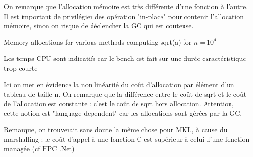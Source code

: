 On remarque que l'allocation mémoire est très différente d'une fonction à l'autre. Il est important de privilégier des opération "in-place" pour contenir l'allocation mémoire, sinon on risque de déclencher la GC qui est couteuse.

\begin{table}[]
\centering
{}
\caption{Memory allocations for various methods computing sqrt(a) for $n = 10^4$}
\end{table}


\newpage


Les temps CPU sont indicatifs car le bench est fait sur une durée caractéristique trop courte


Ici on met en évidence la non linéarité du coût d'allocation par élément d'un tableau de taille n.
On remarque que la différence entre le coût de sqrt et le coût de l'allocation est constante : c'est le coût de sqrt 
hors allocation. Attention, cette notion est "language dependent" car les allocations sont gérées par la GC.



Remarque, on trouverait sans doute la même chose pour MKL, à cause du marshalling : le coût d'appel à une fonction C est supérieur à celui d'une fonction managée (cf HPC .Net)

\newpage


